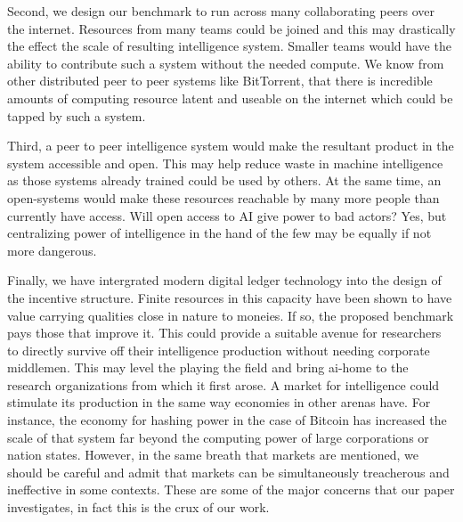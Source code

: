 \documentclass{article}
\begin{document}
Second, we design our benchmark to run across many collaborating peers over the internet. Resources from many teams could be joined and this may drastically the effect the scale of resulting intelligence system. Smaller teams would have the ability to contribute such a system without the needed compute. We know from other distributed peer to peer systems like BitTorrent, that there is incredible amounts of computing resource latent and useable on the internet which could be tapped by such a system.

Third, a peer to peer intelligence system would make the resultant product in the system accessible and open. This may help reduce waste in machine intelligence as those systems already trained could be used by others. At the same time, an open-systems would make these resources reachable by many more people than currently have access. Will open access to AI give power to bad actors? Yes, but centralizing power of intelligence in the hand of the few  may be equally if not more dangerous.

Finally, we have intergrated modern digital ledger technology into the design of the incentive structure. Finite resources in this capacity have been shown to have value carrying qualities close in nature to moneies. If so, the proposed benchmark pays those that improve it. This could provide a suitable avenue for researchers to directly survive off their intelligence production without needing corporate middlemen. This may level the playing the field and bring ai-home to the research organizations from which it first arose. A market for intelligence could stimulate its production in the same way economies in other arenas have. For instance, the economy for hashing power in the case of Bitcoin has increased the scale of that system far beyond the computing power of large corporations or nation states. However, in the same breath that markets are mentioned, we should be careful and admit that markets can be simultaneously treacherous and ineffective in some contexts. These are some of the major concerns that our paper investigates, in fact this is the crux of our work. 
\end{document}
